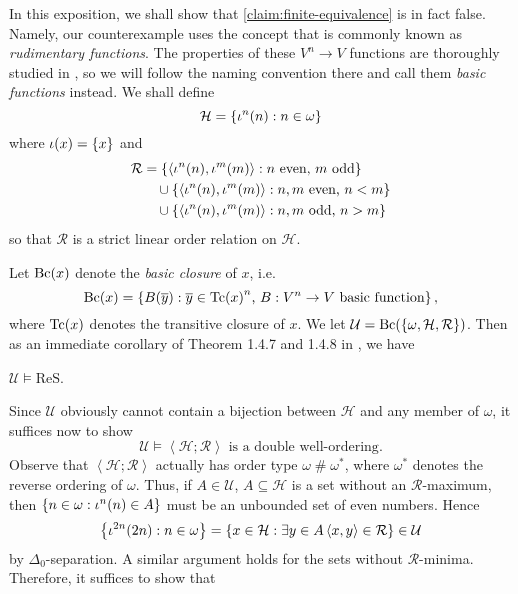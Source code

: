 \documentclass[11pt]{article}
\theoremstyle{plain}
\theoremstyle{definition}
\newcommand{\tuple}[1]{\left\langle #1 \right\rangle}
\newcommand{\ReS}{\mathrm{ReS}}
\DeclareMathOperator{\Tc}{Tc}
\DeclareMathOperator{\Bc}{Bc}
\DeclareMathOperator{\hash}{{\#}}
\begin{document}
In this exposition, we shall show that \autoref{claim:finite-equivalence} is in fact false. Namely, our counterexample uses the concept that is commonly known as \emph{rudimentary functions}. The properties of these $V^n \rightarrow V$ functions are thoroughly studied in \cite{gandy74-set-functions}, so we will follow the naming convention there and call them \emph{basic functions} instead. We shall define
\[\mathcal{H} = \left\{\iota^n\mleft(n\mright) : n \in \omega\right\}\]
where $\iota\mleft(x\mright) = \left\{x\right\}$ and
\begin{align*}
  \mathcal{R} & = \left\{\tuple{\iota^n\mleft(n\mright), \iota^m\mleft(m\mright)} : \text{$n$ even, $m$ odd}\right\}                \\
              & \quad {} \cup \left\{\tuple{\iota^n\mleft(n\mright), \iota^m\mleft(m\mright)} : \text{$n, m$ even, $n < m$}\right\} \\
              & \quad {} \cup \left\{\tuple{\iota^n\mleft(n\mright), \iota^m\mleft(m\mright)} : \text{$n, m$ odd, $n > m$}\right\}
\end{align*}
so that $\mathcal{R}$ is a strict linear order relation on $\mathcal{H}$.

Let $\Bc\mleft(x\mright)$ denote the \emph{basic closure} of $x$, i.e.\
\[\Bc\mleft(x\mright) = \left\{B\mleft(\overline{y}\mright) : \text{$\overline{y} \in \Tc\mleft(x\mright)^n$, $B : V^n \rightarrow V$ basic function}\right\},\]
where $\Tc\mleft(x\mright)$ denotes the transitive closure of $x$. We let $\mathcal{U} = \Bc\mleft(\left\{\omega, \mathcal{H}, \mathcal{R}\right\}\mright)$. Then as an immediate corollary of Theorem 1.4.7 and 1.4.8 in \cite{gandy74-set-functions}, we have

\begin{proposition}
  $\mathcal{U} \vDash \ReS$.
\end{proposition}

Since $\mathcal{U}$ obviously cannot contain a bijection between $\mathcal{H}$ and any member of $\omega$, it suffices now to show
\[\mathcal{U} \vDash \text{$\tuple{\mathcal{H}; \mathcal{R}}$ is a double well-ordering}.\]
Observe that $\tuple{\mathcal{H}; \mathcal{R}}$ actually has order type $\omega \hash \omega^*$, where $\omega^*$ denotes the reverse ordering of $\omega$. Thus, if $A \in \mathcal{U}$, $A \subseteq \mathcal{H}$ is a set without an $\mathcal{R}$-maximum, then $\left\{n \in \omega : \iota^n\mleft(n\mright) \in A\right\}$ must be an unbounded set of even numbers. Hence
\[\left\{\iota^{2n}\mleft(2n\mright) : n \in \omega\right\} = \left\{x \in \mathcal{H} : \exists y \in A \tuple{x, y} \in \mathcal{R}\right\} \in \mathcal{U}\]
by $\Delta_0$-separation. A similar argument holds for the sets without $\mathcal{R}$-minima. Therefore, it suffices to show that
\end{document}
